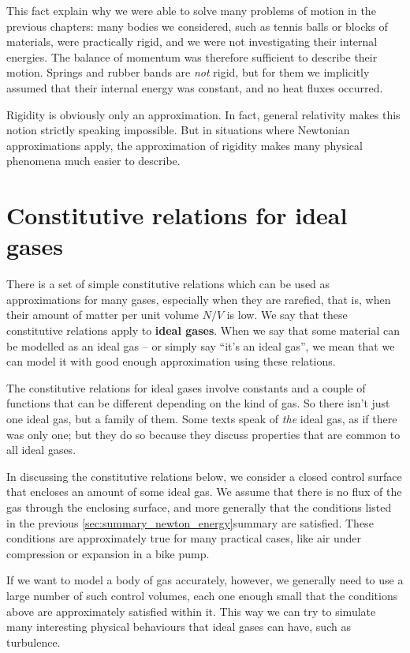 \documentclass[a4paper,12pt,%
onecolumn,oneside,titlepage,%
british%
]{memoir}
\renewcommand*{\|}[1][]{\nonscript\:#1\vert\nonscript\:\mathopen{}}
\newcommand*{\yN}{N}
\begin{document}
This fact explain why we were able to solve many problems of motion in the previous chapters: many bodies we considered, such as tennis balls or blocks of materials, were practically rigid, and we were not investigating their internal energies. The balance of momentum was therefore sufficient to describe their motion. Springs and rubber bands are \emph{not} rigid, but for them we implicitly assumed that their internal energy was constant, and no heat fluxes occurred.

\smallskip

Rigidity is obviously only an approximation. In fact, general relativity makes this notion strictly speaking impossible. But in situations where Newtonian approximations apply, the approximation of rigidity makes many physical phenomena much easier to describe.

\section{Constitutive relations for ideal gases}
\label{sec:int_energy_idealgas}

There is a set of simple constitutive relations which can be used as approximations for many gases, especially when they are rarefied, that is, when their amount of matter per unit volume $\yN/V$ is low. We say that these constitutive relations apply to \textbf{ideal gases}. When we say that some material can be modelled as an ideal gas -- or simply say \enquote{it's an ideal gas}, we mean that we can model it with good enough approximation using these relations.

The constitutive relations for ideal gases involve constants and a couple of functions that can be different depending on the kind of gas. So there isn't just one ideal gas, but a family of them. Some texts speak of \emph{the} ideal gas, as if there was only one; but they do so because they discuss properties that are common to all ideal gases.

\smallskip

In discussing the constitutive relations below, we consider a closed control surface that encloses an amount of some ideal gas. We assume that there is no flux of the gas through the enclosing surface, and more generally that the conditions listed in the previous \ref{sec:summary_newton_energy}{summary} are satisfied. These conditions are approximately true for many practical cases, like air under compression or expansion in a bike pump.

If we want to model a body of gas accurately, however, we generally need to use a large number of such control volumes, each one enough small that the conditions above are approximately satisfied within it. This way we can try to simulate many interesting physical behaviours that ideal gases can have, such as turbulence.
\end{document}
